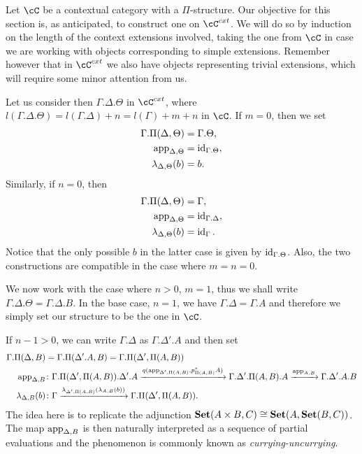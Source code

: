 \begin{construction}
  Let $\cC$ be a contextual category with a $\Pi$-structure. Our objective for
  this section is, as anticipated, to construct one on $\cC^{cxt}$. We will do
  so by induction on the length of the context extensions involved, taking the
  one from $\cC$ in case we are working with objects corresponding to simple
  extensions. Remember however that in $\cC^{cxt}$ we also have objects
  representing trivial extensions, which will require some minor attention from
  us.

  Let us consider then $\Gamma.\Delta.\Theta$ in $\cC^{cxt}$, where
  $l(\Gamma.\Delta.\Theta)=l(\Gamma.\Delta)+n=l(\Gamma)+m+n$ in $\cC$. If
  $m=0$, then we set
  \begin{align*}
    \Gamma.\Pi(\Delta,\Theta) &=\Gamma.\Theta, \\
    \operatorname{app}_{\Delta,\Theta} &=\operatorname{id}_{\Gamma.\Theta}, \\
    \lambda_{\Delta,\Theta}(b) &=b.
  \end{align*}
  Similarly, if $n=0$, then
  \begin{align*}
    \Gamma.\Pi(\Delta,\Theta) &=\Gamma, \\
    \operatorname{app}_{\Delta,\Theta} &=\operatorname{id}_{\Gamma.\Delta}, \\
    \lambda_{\Delta,\Theta}(b) &=\operatorname{id}_\Gamma.
  \end{align*}
  Notice that the only possible $b$ in the latter case is given by
  $\operatorname{id}_{\Gamma.\Theta}$. Also, the two constructions are compatible in the case
  where $m=n=0$.

  We now work with the case where $n>0$, $m=1$, thus we shall write
  $\Gamma.\Delta.\Theta=\Gamma.\Delta.B$. In the base case, $n=1$, we have
  $\Gamma.\Delta=\Gamma.A$ and therefore we simply set our structure to be the
  one in $\cC$.

  If $n-1>0$, we can write
  $\Gamma.\Delta$ as $\Gamma.\Delta'.A$ and then set
  \begin{align*}
    \Gamma.\Pi(\Delta,B)
    &=\Gamma.\Pi(\Delta'.A,B)=\Gamma.\Pi(\Delta',\Pi(A,B)) \\
    \operatorname{app}_{\Delta,B} &\colon
                    \Gamma.\Pi(\Delta',\Pi(A,B)).\Delta'.A
                    \xrightarrow{q(\operatorname{app}_{\Delta',\Pi(A,B)},p^*_{\Pi(A,B)}A)}\Gamma.\Delta'.\Pi(A,B).A
                    \xrightarrow{\operatorname{app}_{A,B}}\Gamma.\Delta'.A.B \\
    \lambda_{\Delta,B}(b)
    &\colon
    \Gamma
    \xrightarrow{\lambda_{\Delta',\Pi(A,B)}(\lambda_{A,B}(b))}
    \Gamma.\Pi(\Delta',\Pi(A,B)).
  \end{align*}
  The idea here is to replicate the adjunction $\operatorname{\mathbf{Set}}(A\times
  B,C)\cong\operatorname{\mathbf{Set}}(A,\operatorname{\mathbf{Set}}(B,C))$. The map $\operatorname{app}_{\Delta,B}$ is then naturally
  interpreted as a sequence of partial evaluations and the phenomenon is
  commonly known as \emph{currying-uncurrying}.


\end{construction}
